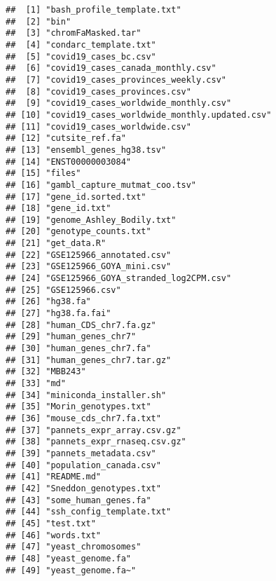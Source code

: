 \documentclass[
]{article}
\begin{document}
\begin{verbatim}
##  [1] "bash_profile_template.txt"                  
##  [2] "bin"                                        
##  [3] "chromFaMasked.tar"                          
##  [4] "condarc_template.txt"                       
##  [5] "covid19_cases_bc.csv"                       
##  [6] "covid19_cases_canada_monthly.csv"           
##  [7] "covid19_cases_provinces_weekly.csv"         
##  [8] "covid19_cases_provinces.csv"                
##  [9] "covid19_cases_worldwide_monthly.csv"        
## [10] "covid19_cases_worldwide_monthly.updated.csv"
## [11] "covid19_cases_worldwide.csv"                
## [12] "cutsite_ref.fa"                             
## [13] "ensembl_genes_hg38.tsv"                     
## [14] "ENST00000003084"                            
## [15] "files"                                      
## [16] "gambl_capture_mutmat_coo.tsv"               
## [17] "gene_id.sorted.txt"                         
## [18] "gene_id.txt"                                
## [19] "genome_Ashley_Bodily.txt"                   
## [20] "genotype_counts.txt"                        
## [21] "get_data.R"                                 
## [22] "GSE125966_annotated.csv"                    
## [23] "GSE125966_GOYA_mini.csv"                    
## [24] "GSE125966_GOYA_stranded_log2CPM.csv"        
## [25] "GSE125966.csv"                              
## [26] "hg38.fa"                                    
## [27] "hg38.fa.fai"                                
## [28] "human_CDS_chr7.fa.gz"                       
## [29] "human_genes_chr7"                           
## [30] "human_genes_chr7.fa"                        
## [31] "human_genes_chr7.tar.gz"                    
## [32] "MBB243"                                     
## [33] "md"                                         
## [34] "miniconda_installer.sh"                     
## [35] "Morin_genotypes.txt"                        
## [36] "mouse_cds_chr7.fa.txt"                      
## [37] "pannets_expr_array.csv.gz"                  
## [38] "pannets_expr_rnaseq.csv.gz"                 
## [39] "pannets_metadata.csv"                       
## [40] "population_canada.csv"                      
## [41] "README.md"                                  
## [42] "Sneddon_genotypes.txt"                      
## [43] "some_human_genes.fa"                        
## [44] "ssh_config_template.txt"                    
## [45] "test.txt"                                   
## [46] "words.txt"                                  
## [47] "yeast_chromosomes"                          
## [48] "yeast_genome.fa"                            
## [49] "yeast_genome.fa~"
\end{verbatim}
\end{document}
